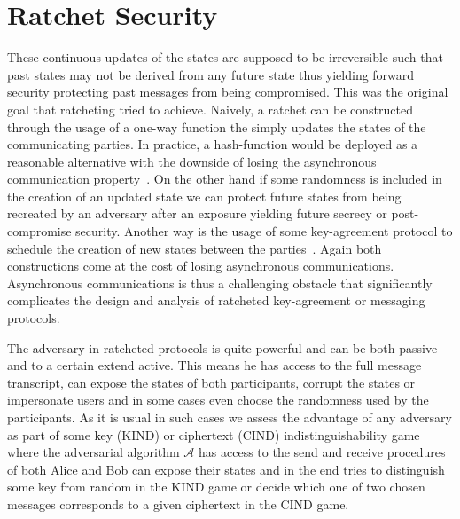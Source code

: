 \documentclass[11pt,a4paper,twoside,openright,bibliography=totoc]{scrbook}
\begin{document}
\section{Ratchet Security}
\label{sec:ratchet-security}

These continuous updates of the states are supposed to be irreversible
such that past states may not be derived from any future state thus
yielding forward security protecting past messages from being
compromised. This was the original goal that ratcheting tried to
achieve. Naively, a ratchet can be constructed through the usage of a
one-way function the simply updates the states of the communicating
parties. In practice, a hash-function would be deployed as a
reasonable alternative with the downside of losing the asynchronous
communication property~\cite{bellare2003forward}. On the other hand if
some randomness is included in the creation of an updated state we can
protect future states from being recreated by an adversary after an
exposure yielding future secrecy or post-compromise security. Another
way is the usage of some key-agreement protocol to schedule the
creation of new states between the parties~\cite{cohn2016post}.  Again
both constructions come at the cost of losing asynchronous
communications. Asynchronous communications is thus a challenging
obstacle that significantly complicates the design and analysis
of ratcheted key-agreement or messaging protocols.

\bigskip

The adversary in ratcheted protocols is quite powerful and can be both
passive and to a certain extend active. This means he has access to
the full message transcript, can expose the states of both
participants, corrupt the states or impersonate users and in some
cases even choose the randomness used by the participants. As it is
usual in such cases we assess the advantage of any adversary as part
of some key (KIND) or ciphertext (CIND) indistinguishability game
where the adversarial algorithm $\mathcal{A}$ has access to the send
and receive procedures of both Alice and Bob can expose their states
and in the end tries to distinguish some key from random in the KIND
game or decide which one of two chosen messages corresponds to a given
ciphertext in the CIND game.
\end{document}

